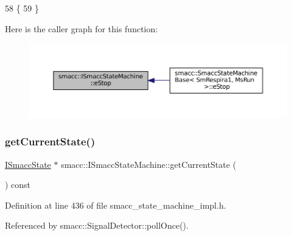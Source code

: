 \begin{DoxyCode}
58 \{
59 \}
\end{DoxyCode}
Here is the caller graph for this function\+:
\nopagebreak
\begin{figure}[H]
\begin{center}
\leavevmode
\includegraphics[width=350pt]{classsmacc_1_1ISmaccStateMachine_a66a2900be8629748dab7a5c5ab6ae94e_icgraph}
\end{center}
\end{figure}
\mbox{\label{classsmacc_1_1ISmaccStateMachine_a610d09dc5341fb63732be713c21fbe86}} 
\subsubsection{\texorpdfstring{get\+Current\+State()}{getCurrentState()}}
{\footnotesize\ttfamily \hyperlink{classsmacc_1_1ISmaccState}{I\+Smacc\+State} $\ast$ smacc\+::\+I\+Smacc\+State\+Machine\+::get\+Current\+State (\begin{DoxyParamCaption}{ }\end{DoxyParamCaption}) const\hspace{0.3cm}{\ttfamily [inline]}}



Definition at line 436 of file smacc\+\_\+state\+\_\+machine\+\_\+impl.\+h.



Referenced by smacc\+::\+Signal\+Detector\+::poll\+Once().


